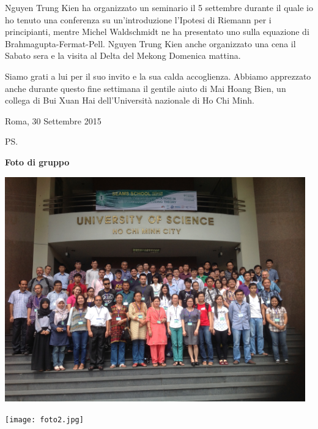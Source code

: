 \documentclass[12pt,a4paper]{letter}
\begin{document}
\begin{letter}
Nguyen Trung Kien ha organizzato un seminario il 5 settembre durante il quale io ho tenuto una conferenza su 
un'introduzione l'Ipotesi di Riemann per i principianti, mentre Michel Waldschmidt ne ha presentato uno 
sulla equazione di Brahmagupta-Fermat-Pell. Nguyen Trung Kien anche organizzato una cena il Sabato sera e 
la visita al Delta del Mekong Domenica mattina.

Siamo grati a lui per il suo invito e la sua calda accoglienza. 
Abbiamo apprezzato anche durante questo fine settimana il gentile aiuto di Mai Hoang Bien, 
un collega di Bui Xuan Hai dell'Universit\`a nazionale di Ho Chi Minh.

\closing{Roma, 30 Settembre 2015}

\ps

\vfill \newpage

\centerline{\textbf{Foto di gruppo}}



\includegraphics[width=13cm]{foto1.jpg}


\texttt{[image: foto2.jpg]}
\end{letter}
\end{document}
